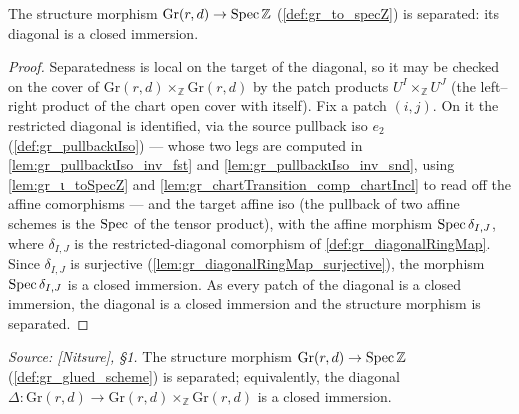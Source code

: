 \begin{lemma}\leanok
  \label{lem:gr_separated_toSpecZ}
  The structure morphism \(\mathrm{Gr}(r,d) \to \operatorname{Spec} \mathbb{Z}\)
  (\cref{def:gr_to_specZ}) is separated: its diagonal is a closed immersion.
\end{lemma}
\begin{proof}
    \leanok
  Separatedness is local on the target of the diagonal, so it may be checked on
  the cover of \(\mathrm{Gr}(r,d) \times_{\mathbb{Z}} \mathrm{Gr}(r,d)\) by the
  patch products \(U^I \times_{\mathbb{Z}} U^J\) (the left--right product of the
  chart open cover with itself). Fix a patch \((i,j)\). On it the restricted
  diagonal is identified, via the source pullback iso \(e_2\)
  (\cref{def:gr_pullbackιIso}) — whose two legs are computed in
  \cref{lem:gr_pullbackιIso_inv_fst} and \cref{lem:gr_pullbackιIso_inv_snd},
  using \cref{lem:gr_ι_toSpecZ} and \cref{lem:gr_chartTransition_comp_chartIncl}
  to read off the affine comorphisms — and the target affine iso (the pullback of
  two affine schemes is the \(\operatorname{Spec}\) of the tensor product), with the affine
  morphism \(\operatorname{Spec} \delta_{I,J}\), where \(\delta_{I,J}\) is the
  restricted-diagonal comorphism of \cref{def:gr_diagonalRingMap}. Since
  \(\delta_{I,J}\) is surjective (\cref{lem:gr_diagonalRingMap_surjective}), the
  morphism \(\operatorname{Spec} \delta_{I,J}\) is a closed immersion. As every patch of the
  diagonal is a closed immersion, the diagonal is a closed immersion and the
  structure morphism is separated.
\end{proof}

\begin{lemma}\leanok
  \label{lem:gr_separated}
  \textit{Source: [Nitsure], \S 1.}
  The structure morphism \(\mathrm{Gr}(r,d) \to \operatorname{Spec} \mathbb{Z}\)
  (\cref{def:gr_glued_scheme}) is separated; equivalently, the diagonal
  \(\Delta : \mathrm{Gr}(r,d) \to \mathrm{Gr}(r,d) \times_{\mathbb{Z}}
  \mathrm{Gr}(r,d)\) is a closed immersion.
\end{lemma}


